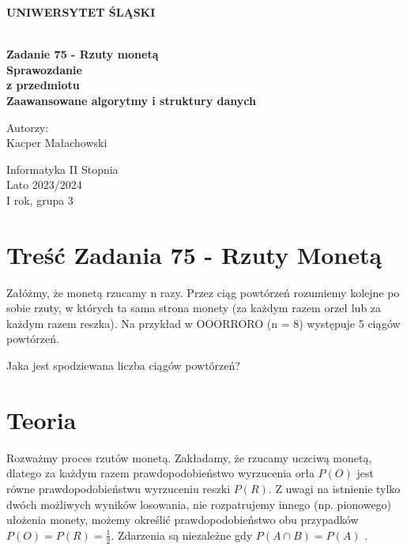 \documentclass[12pt,oneside,a4paper]{book} %
\theoremstyle{break}
\begin{document}
\thispagestyle{empty}
\begin{center}
  \Large
  \bf{UNIWERSYTET ŚLĄSKI}\\
  \bf{}\\[25mm]
  \large

  \bf{Zadanie 75 - Rzuty monetą}\\[35mm]

  Sprawozdanie\\
  z przedmiotu\\
  Zaawansowane algorytmy i struktury danych\\[25mm]
\end{center}
\begin{flushright}
  \large
  Autorzy:\\
  Kacper Małachowski\\
\end{flushright}
\vspace*{\fill}
\begin{center}
  Informatyka II Stopnia\\
  Lato 2023/2024\\
  I rok, grupa 3\\[25mm]
\end{center}

\chapter*{Treść Zadania 75 - Rzuty Monetą}

Załóżmy, że monetą rzucamy n razy. Przez ciąg powtórzeń rozumiemy kolejne po sobie rzuty, w których ta sama strona monety (za każdym razem orzeł lub za każdym razem reszka). Na przykład w OOORRORO (n = 8) występuje 5 ciągów powtórzeń.

Jaka jest spodziewana liczba ciągów powtórzeń?

\chapter*{Teoria}

Rozważmy proces rzutów monetą. Zakładamy, że rzucamy uczciwą monetą, dlatego za każdym razem prawdopodobieństwo wyrzucenia orła $P(O)$ jest równe prawdopodobieństwu wyrzuceniu reszki $P(R)$. Z uwagi na istnienie tylko dwóch możliwych wyników losowania, nie rozpatrujemy innego (np. pionowego) ułożenia monety, możemy określić prawdopodobieństwo obu przypadków $P(O)=P(R)=\frac{1}{2}$.
Zdarzenia są niezależne gdy $P(A \cap B) = P(A)$ \cite{MetProb}.
\end{document}
